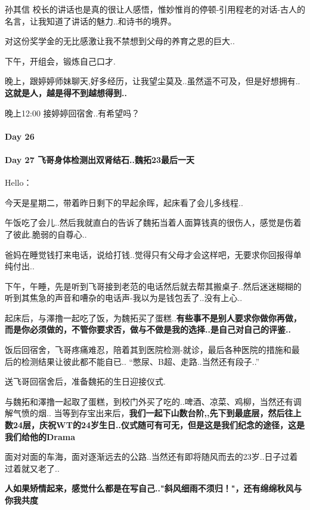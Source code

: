 \documentclass[UTF8,a4paper,8pt]{ctexbook}
\begin{document}
	 	 孙其信 校长的讲话也是真的很让人感悟，惟妙惟肖的停顿-引用程老的对话-古人的名言，让我知道了讲话的魅力..和诗书的境界。
	 	 
	 	 对这份奖学金的无比感激让我不禁想到父母的养育之恩的巨大..
	 	 
	 	 下午，开组会，锻炼自己口才.
	 	 
	 	 晚上，跟婷婷师妹聊天,好多经历，让我望尘莫及..虽然遥不可及，但是好想拥有..\textbf{这就是人，越是得不到越想得到..}
	 	 
	 	 晚上12:00 接婷婷回宿舍..有希望吗？
 	 \paragraph{Day 26      \quad     }
 	 \paragraph{Day 27   飞哥身体检测出双肾结石..魏拓23最后一天   \quad     }
	 	 Hello：
	 	 
	 	 今天是星期二，带着昨日剩下的早起余晖，起床看了会儿多线程..
	 	 
	 	 午饭吃了会儿..然后我就直白的告诉了魏拓当着人面算钱真的很伤人，感觉是伤着了彼此.脆弱的自尊心..
	 	 
	 	 爸妈在睡觉钱打来电话，说给打钱..觉得只有父母才会这样吧，无要求你回报得单纯付出..
	 	 
	 	 下午，午睡，先是听到飞哥接到老范的电话然后就去帮其搬桌子..然后迷迷糊糊的听到其焦急的声音和嘈杂的电话声-我以为是钱包丢了..没有上心..
	 	 
	 	 起床后，与澤撸一起吃了饭，为魏拓买了蛋糕..\textbf{有些事不是别人要求你做你再做，而是你必须做的，不管你要求否，做与不做是我的选择..是自己对自己的评鉴..}
	 	 
	 	 饭后回宿舍，飞哥疼痛难忍，陪着其到医院检测-就诊，最后各种医院的措施和最后的检测结果让彼此都不能自已.. “憋尿、B超、走路..当然还有段子..”
	 	 
	 	 送飞哥回宿舍后，准备魏拓的生日迎接仪式.
	 	 
	 	 与魏拓和澤撸一起取了蛋糕，到校门外买了吃的..啤酒、凉菜、鸡柳，当然还有调解气愤的烟..
	 	 当等到存宝出来后，\textbf{我们一起下山数台阶,,先下到最底层，然后往上数24层，庆祝WT的24岁生日..仪式随可有可无，但是这是我们纪念的途径，这是我们给他的Drama}
	 	 
	 	 面对对面的车海，面对逐渐远去的公路..当然还有即将随风而去的23岁..日子过着过着就又老了..
	 	 
	 	 \textbf{人如果矫情起来，感觉什么都是在写自己.."斜风细雨不须归！"，还有绵绵秋风与你我共度}
	 	 
\end{document}
